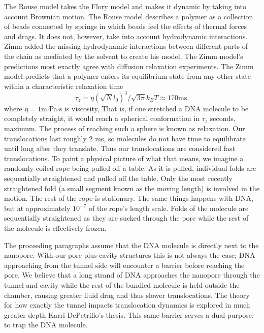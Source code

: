 \documentclass[aps,prl,preprint,groupedaddress]{revtex4}
\begin{document}
The Rouse model takes the Flory model and makes it dynamic by taking into account Brownian motion.
The Rouse model describes a polymer as a collection of beads connected by springs in which beads feel the effects of thermal forces and drags.
It does not, however, take into account hydrodynamic interactions.
Zimm added the missing hydrodynamic interactions between different parts of the chain as mediated by the solvent to create his model.
The Zimm model's predictions most exactly agree with diffusion relaxation experiments.
The Zimm model predicts that a polymer enters its equilibrium state from any other state within a characteristic relaxation time\cite{zimm-eqn}
\begin{equation}\tau_z=\eta (\sqrt{N}l_0)^3/\sqrt{3\pi}k_BT \approx 170 \mathrm{ms}.\end{equation}
where $\eta = 1$m$\cdot$Pa$\cdot$s is viscosity, 
That is, if one stretched a DNA molecule to be completely straight, it would reach a spherical conformation in \(\tau_z\) seconds, maximum.
The process of reaching such a sphere is known as relaxation.
Our translocations last roughly 2 ms, so molecules do not have time to equilibrate until long after they translate.
Thus our translocations are considered fast translocations. To paint a physical picture of what that means, we imagine a randomly coiled rope being pulled off a table.
As it is pulled, individual folds are sequentially straightened and pulled off the table.
Only the most recently straightened fold (a small segment known as the moving length) is involved in the motion.
The rest of the rope is stationary.
The same things happens with DNA, but at approximately $10^{-7}$ of the rope's length scale.
Folds of the molecule are sequentially straightened as they are sucked through the pore while the rest of the molecule is effectively frozen.

The proceeding paragraphs assume that the DNA molecule is directly next to the nanopore.
With our pore-plus-cavity structures this is not always the case; DNA approaching from the tunnel side will encounter a barrier before reaching the pore.
We believe that a long strand of DNA approaches the nanopore through the tunnel and cavity while the rest of the bundled molecule is held outside the chamber, causing greater fluid drag and thus slower translocations.
The theory for how exactly the tunnel impacts translocation dynamics is explored in much greater depth Karri DePetrillo's thesis.
This same barrier serves a dual purpose: to trap the DNA molecule.
\end{document}
